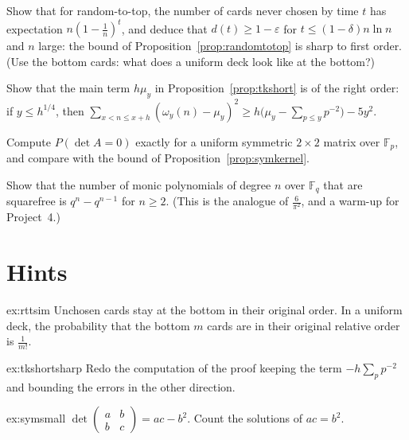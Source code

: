 \begin{exercise}[$\star$]\label{ex:rttsim}
Show that for random-to-top, the number of cards never chosen by time $t$ has expectation $n(1-\frac1n)^t$, and deduce that $d(t)\ge1-\varepsilon$ for $t\le(1-\delta)n\ln n$ and $n$ large: the bound of Proposition~\ref{prop:randomtotop} is sharp to first order. (Use the bottom cards: what does a uniform deck look like at the bottom?)
\end{exercise}

\begin{exercise}[$\star\star$]\label{ex:tkshortsharp}
Show that the main term $h\mu_y$ in Proposition~\ref{prop:tkshort} is of the right order: if $y\le h^{1/4}$, then $\sum_{x<n\le x+h}(\omega_y(n)-\mu_y)^2\ge h\bigl(\mu_y-\sum_{p\le y}p^{-2}\bigr)-5y^2$.
\end{exercise}

\begin{exercise}[$\star\star$]\label{ex:symsmall}
Compute $P(\det A=0)$ exactly for a uniform symmetric $2\times2$ matrix over $\mathbb F_p$, and compare with the bound of Proposition~\ref{prop:symkernel}.
\end{exercise}

\begin{exercise}[$\star\star$]\label{ex:ffcount}
Show that the number of monic polynomials of degree $n$ over $\mathbb F_q$ that are squarefree is $q^n-q^{n-1}$ for $n\ge2$. (This is the analogue of $\frac6{\pi^2}$, and a warm-up for Project~4.)
\end{exercise}

\section{Hints}

\begin{hint}{ex:rttsim}
Unchosen cards stay at the bottom in their original order. In a uniform deck, the probability that the bottom $m$ cards are in their original relative order is $\frac1{m!}$.
\end{hint}

\begin{hint}{ex:tkshortsharp}
Redo the computation of the proof keeping the term $-h\sum_pp^{-2}$ and bounding the errors in the other direction.
\end{hint}

\begin{hint}{ex:symsmall}
$\det\begin{pmatrix}a&b\\b&c\end{pmatrix}=ac-b^2$. Count the solutions of $ac=b^2$.
\end{hint}

